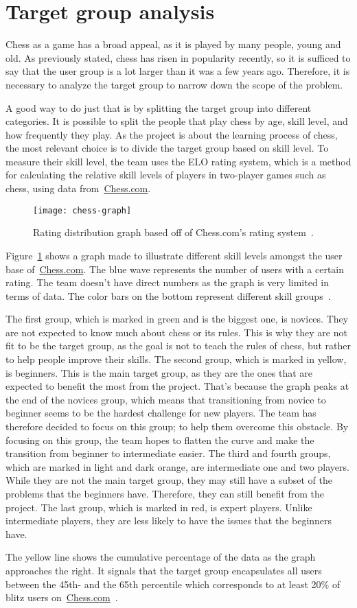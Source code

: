 \section{Target group analysis}\label{sec:target-group-analysis}

Chess as a game has a broad appeal, as it is played by many people, young and old.
As previously stated, chess has risen in popularity recently, so it is sufficed to say that the user group is a lot
larger than it was a few years ago.
Therefore, it is necessary to analyze the target group to narrow down the scope of the problem.

A good way to do just that is by splitting the target group into different categories.
It is possible to split the people that play chess by age, skill level, and how frequently they play.
As the project is about the learning process of chess, the most relevant choice is to divide the target group based on
skill level.
To measure their skill level, the team uses the ELO rating system, which is a method for calculating the relative skill
levels of players in two-player games such as chess, using data from~\url{Chess.com}.

\begin{figure}[H]
    \centering
    \texttt{[image: chess-graph]}
    \caption{Rating distribution graph based off of Chess.com's rating system~\cite{chess-ratings}.}\label{fig:graph}
\end{figure}

Figure~\ref{fig:graph} shows a graph made to illustrate different skill levels amongst the user base
of~\url{Chess.com}.
The blue wave represents the number of users with a certain rating.
The team doesn't have direct numbers as the graph is very limited in terms of data.
The color bars on the bottom represent different skill groups~\cite{chess-ratings}.

The first group, which is marked in green and is the biggest one, is novices.
They are not expected to know much about chess or its rules.
This is why they are not fit to be the target group, as the goal is not to teach the rules of chess, but rather to help
people improve their skills.
The second group, which is marked in yellow, is beginners.
This is the main target group, as they are the ones that are expected to benefit the most from the project.
That's because the graph peaks at the end of the novices group, which means that transitioning from novice to beginner
seems to be the hardest challenge for new players.
The team has therefore decided to focus on this group; to help them overcome this obstacle.
By focusing on this group, the team hopes to flatten the curve and make the transition from beginner to intermediate
easier.
The third and fourth groups, which are marked in light and dark orange, are intermediate one and two players.
While they are not the main target group, they may still have a subset of the problems that the beginners have.
Therefore, they can still benefit from the project.
The last group, which is marked in red, is expert players.
Unlike intermediate players, they are less likely to have the issues that the beginners have.

The yellow line shows the cumulative percentage of the data as the graph approaches the right.
It signals that the target group encapsulates all users between the 45th- and the 65th percentile which corresponds to
at least 20\% of blitz users on~\url{Chess.com}~\cite{chess-ratings}.
